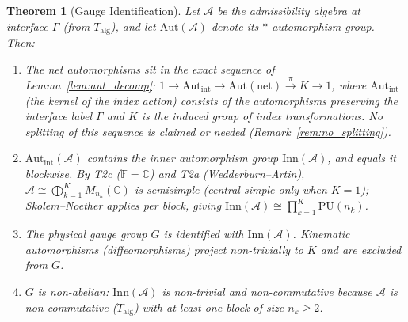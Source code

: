 \documentclass[11pt]{article}
\newtheorem{theorem}{Theorem}[section]
\theoremstyle{definition}
\begin{document}
\begin{theorem}[Gauge Identification]\label{thm:gauge_ident}
Let $\mathcal{A}$ be the admissibility algebra at interface $\Gamma$
(from $T_{\mathrm{alg}}$), and let $\mathrm{Aut}(\mathcal{A})$ denote
its $*$-automorphism group.  Then:
\begin{enumerate}[label=(\roman*),nosep]
  \item The net automorphisms sit in the exact sequence of
        Lemma~\ref{lem:aut_decomp}:
        $1 \to \mathrm{Aut}_{\mathrm{int}} \to
        \mathrm{Aut}(\text{net}) \xrightarrow{\pi} K \to 1$, where
        $\mathrm{Aut}_{\mathrm{int}}$ (the kernel of the index action)
        consists of the automorphisms preserving the interface label
        $\Gamma$ and $K$ is the induced group of index transformations.
        No splitting of this sequence is claimed or needed
        (Remark~\ref{rem:no_splitting}).
  \item $\mathrm{Aut}_{\mathrm{int}}(\mathcal{A})$ contains the inner
        automorphism group $\mathrm{Inn}(\mathcal{A})$, and equals it
        blockwise.  By T2c ($\mathbb{F} = \mathbb{C}$) and T2a
        (Wedderburn--Artin), $\mathcal{A} \cong \bigoplus_{k=1}^{K}
        M_{n_k}(\mathbb{C})$ is \emph{semisimple} (central simple only
        when $K = 1$); Skolem--Noether applies per block, giving
        $\mathrm{Inn}(\mathcal{A}) \cong \prod_{k=1}^{K}
        \mathrm{PU}(n_k)$.
  \item The physical gauge group $G$ is identified with
        $\mathrm{Inn}(\mathcal{A})$.  Kinematic automorphisms
        (diffeomorphisms) project non-trivially to $K$ and are
        excluded from $G$.
  \item $G$ is non-abelian: $\mathrm{Inn}(\mathcal{A})$ is non-trivial
        and non-commutative because $\mathcal{A}$ is non-commutative
        ($T_{\mathrm{alg}}$) with at least one block of size
        $n_k \ge 2$.
\end{enumerate}
\end{theorem}
\end{document}
